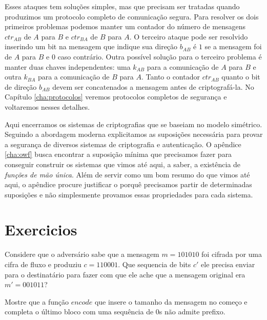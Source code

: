 Esses ataques tem soluções simples, mas que precisam ser tratadas quando produzimos um protocolo completo de comunicação segura.
Para resolver os dois primeiros problemas podemos manter um contador do número de mensagens $ctr_{AB}$ de $A$ para $B$ e $ctr_{BA}$ de $B$ para $A$.
O terceiro ataque pode ser resolvido inserindo um bit na mensagem que indique sua direção $b_{AB}$ é $1$ se a mensagem foi de $A$ para $B$ e $0$ caso contrário.
Outra possível solução para o terceiro problema é manter duas chaves independentes: uma $k_{AB}$ para a comunicação de $A$ para $B$ e outra $k_{BA}$ para a comunicação de $B$ para $A$.
Tanto o contador $ctr_{AB}$ quanto o bit de direção $b_{AB}$ devem ser concatenados a mensagem antes de criptografá-la.
No Capítulo \ref{cha:protocolos} veremos protocolos completos de segurança e voltaremos nesses detalhes.

Aqui encerramos os sistemas de criptografias que se baseiam no modelo simétrico.
Seguindo a abordagem moderna explicitamos as suposições necessária para provar a segurança de diversos sistemas de criptografia e autenticação.
O apêndice \ref{cha:owf} busca encontrar a suposição mínima que precisamos fazer para conseguir construir os sistemas que vimos até aqui, a saber, a existência de {\em funções de mão única}.
Além de servir como um bom resumo do que vimos até aqui, o apêndice procure justificar o porquê precisamos partir de determinadas suposições e não simplesmente provamos essas propriedades para cada sistema.

\section{Exercicios}
\label{sec:exercicios}


\begin{exercicio}
  Considere que o adversário sabe que a mensagem $m = 101010$ foi cifrada por uma cifra de fluxo e produziu $c = 110001$.
  Que sequencia de bits $c'$ ele precisa enviar para o destinatário para fazer com que ele ache que a mensagem original era $m' = 001011$?
\end{exercicio}


\begin{exercicio}
  Mostre que a função $encode$ que insere o tamanho da mensagem no começo e completa o último bloco com uma sequência de $0$s não admite prefixo.
\end{exercicio}

